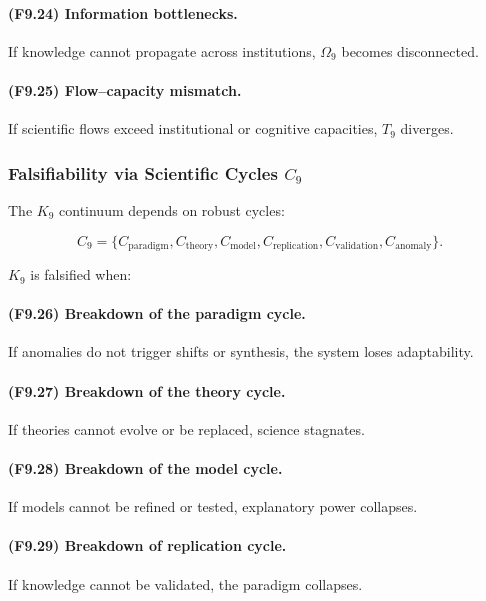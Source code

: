\paragraph{(F9.24) Information bottlenecks.}
If knowledge cannot propagate across institutions,
$\Omega_9$ becomes disconnected.

\paragraph{(F9.25) Flow–capacity mismatch.}
If scientific flows exceed institutional or cognitive capacities,
$T_9$ diverges.



\subsubsection{Falsifiability via Scientific Cycles \texorpdfstring{$C_9$}{C_9}}

The $K_9$ continuum depends on robust cycles:

\[
C_9 = \{
C_{\mathrm{paradigm}},
C_{\mathrm{theory}},
C_{\mathrm{model}},
C_{\mathrm{replication}},
C_{\mathrm{validation}},
C_{\mathrm{anomaly}}
\}.
\]

$K_9$ is falsified when:

\paragraph{(F9.26) Breakdown of the paradigm cycle.}
If anomalies do not trigger shifts or synthesis,
the system loses adaptability.

\paragraph{(F9.27) Breakdown of the theory cycle.}
If theories cannot evolve or be replaced,
science stagnates.

\paragraph{(F9.28) Breakdown of the model cycle.}
If models cannot be refined or tested,
explanatory power collapses.

\paragraph{(F9.29) Breakdown of replication cycle.}
If knowledge cannot be validated,
the paradigm collapses.

